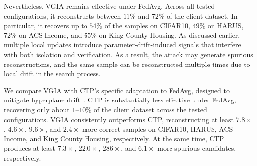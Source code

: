 Nevertheless, VGIA remains effective under FedAvg. Across all tested configurations, it reconstructs between $11\%$ and $72\%$ of the client dataset. In particular, it recovers up to $54\%$ of the samples on CIFAR10, $49\%$ on HARUS, $72\%$ on ACS Income, and $65\%$ on King County Housing. As discussed earlier, multiple local updates introduce parameter-drift-induced signals that interfere with both isolation and verification. As a result, the attack may generate spurious reconstructions, and the same sample can be reconstructed multiple times due to local drift in the search process.

We compare VGIA with CTP's specific adaptation to FedAvg, designed to mitigate hyperplane drift~\cite[Appendix~F.1]{ctp_paper}. 
CTP is substantially less effective under FedAvg, recovering only about $1$--$10\%$ of the client dataset across the tested configurations.
VGIA consistently outperforms CTP, reconstructing at least \(7.8\times\), \(4.6\times\), \(9.6\times\), and \(2.4\times\) more correct samples on CIFAR10, HARUS, ACS Income, and King County Housing, respectively. At the same time, CTP produces at least \(7.3\times\), \(22.0\times\), \(286\times\), and \(6.1\times\) more spurious candidates, respectively.

